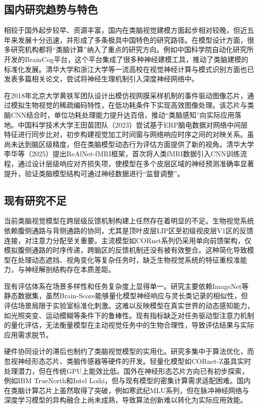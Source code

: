 \subsection{国内研究趋势与特色}

相较于国外起步较早、资源丰富，国内在类脑视觉建模方面起步相对较晚，但近五年来发展十分迅速，并形成了多条极具中国特色的研究路径。在模型设计方面，很多研究机构都将“类脑计算”纳入了重点的研究方向。例如中国科学院自动化研究所开发的BrainCog平台，这个平台集成了很多种神经建模工具，推动了类脑建模的标准化发展。清华大学和浙江大学等一流高校在视觉神经计算与模式识别方面也已发表多篇相关论文，尝试将神经生理机制引入深度神经网络中。

在2018年北京大学黄铁军团队设计出模仿视网膜采样机制的事件驱动图像芯片，通过模拟生物视觉的稀疏编码特性，在低功耗条件下实现高效图像处理。该芯片与类脑CNN结合时，单位功耗处理能力提升达百倍，推动“类脑感知”向实际应用落地。中国科学技术大学王田苗团队（2023）尝试基于ERP脑电数据对网络中间层特征进行同步比对，初步构建视觉加工时间窗与网络响应时序之间的对映关系。虽尚未达到脑区级精度，但在类脑模型动态行为评估方面提供了新的视角。清华大学李华等（2025）提出ReAlNet-fMRI框架，首次将人类fMRI数据引入CNN训练流程，通过设计层级响应对齐损失项，使模型在多个皮层区域的神经预测准确率显著提升，验证类脑模型结构可通过神经数据进行“监督调整”。

\subsection{现有研究不足}

当前类脑视觉模型在跨层级反馈机制构建上任然存在着明显的不足。生物视觉系统依赖腹侧通路与背侧通路的协同，尤其是顶叶皮层LIP区至初级视皮层V1区的反馈连接，对注意力分配至关重要。主流模型如CORnet系列仍采用单向前馈架构，仅模拟腹侧通路的时序传递，跨脑区的反馈机制还没有被有效整合。这种简化导致模型在处理动态遮挡、视角变化等复杂任务时，缺乏生物视觉系统的特征重校准能力，与神经解剖结构存在本质差距。

现有评估体系在场景多样性和任务复杂度上显得单一。研究主要依赖ImageNet等静态数据集，虽然Brain-Score能够量化模型神经响应与灵长类记录的相似性，但评估场景局限于实验室标准化刺激。这难以反映模型在真实世界的动态感知能力，如光照突变、运动模糊等条件下的鲁棒性。现有指标缺乏对任务驱动型注意力机制的量化评估，无法衡量模型在主动视觉任务中的生物合理性，导致评估结果与实际应用需求脱节。

硬件协同设计的滞后也制约了类脑视觉模型的实用化。研究多集中于算法优化，而忽视神经形态芯片、类脑传感器等硬件的开发。轻量化模型如CORnet-Z虽具实时处理潜力，但在传统GPU上能效比低。国外在神经形态芯片方向已有初步探索，例如IBM TrueNorth和Intel Loihi，但与现有模型的密集计算需求适配困难。国内在类脑计算芯片上虽然取得了突破，例如寒武纪MLU系列，但在脉冲神经网络与深度学习模型的异构融合上尚未成熟，导致算法创新难以转化为实际应用效能。

